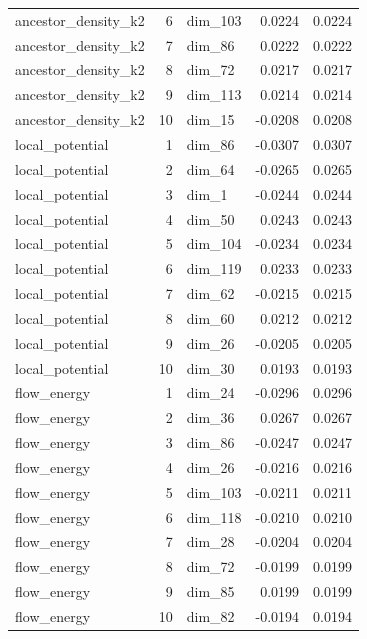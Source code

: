 \begin{table}
\begin{tabular}{lrlrr}
ancestor_density_k2 & 6 & dim_103 & 0.0224 & 0.0224 \\
ancestor_density_k2 & 7 & dim_86 & 0.0222 & 0.0222 \\
ancestor_density_k2 & 8 & dim_72 & 0.0217 & 0.0217 \\
ancestor_density_k2 & 9 & dim_113 & 0.0214 & 0.0214 \\
ancestor_density_k2 & 10 & dim_15 & -0.0208 & 0.0208 \\
local_potential & 1 & dim_86 & -0.0307 & 0.0307 \\
local_potential & 2 & dim_64 & -0.0265 & 0.0265 \\
local_potential & 3 & dim_1 & -0.0244 & 0.0244 \\
local_potential & 4 & dim_50 & 0.0243 & 0.0243 \\
local_potential & 5 & dim_104 & -0.0234 & 0.0234 \\
local_potential & 6 & dim_119 & 0.0233 & 0.0233 \\
local_potential & 7 & dim_62 & -0.0215 & 0.0215 \\
local_potential & 8 & dim_60 & 0.0212 & 0.0212 \\
local_potential & 9 & dim_26 & -0.0205 & 0.0205 \\
local_potential & 10 & dim_30 & 0.0193 & 0.0193 \\
flow_energy & 1 & dim_24 & -0.0296 & 0.0296 \\
flow_energy & 2 & dim_36 & 0.0267 & 0.0267 \\
flow_energy & 3 & dim_86 & -0.0247 & 0.0247 \\
flow_energy & 4 & dim_26 & -0.0216 & 0.0216 \\
flow_energy & 5 & dim_103 & -0.0211 & 0.0211 \\
flow_energy & 6 & dim_118 & -0.0210 & 0.0210 \\
flow_energy & 7 & dim_28 & -0.0204 & 0.0204 \\
flow_energy & 8 & dim_72 & -0.0199 & 0.0199 \\
flow_energy & 9 & dim_85 & 0.0199 & 0.0199 \\
flow_energy & 10 & dim_82 & -0.0194 & 0.0194 \\
\bottomrule
\end{tabular}
\end{table}
